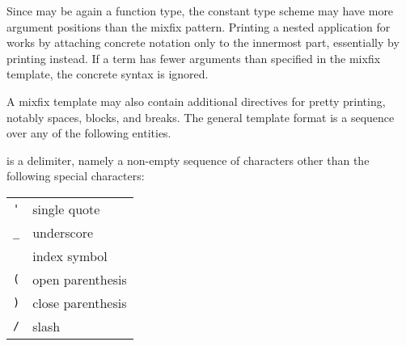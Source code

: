 \begin{isabellebody}
\begin{isamarkuptext}
  Since  may be again a function type, the constant
  type scheme may have more argument positions than the mixfix
  pattern.  Printing a nested application  for
   works by attaching concrete notation only to the
  innermost part, essentially by printing 
  instead.  If a term has fewer arguments than specified in the mixfix
  template, the concrete syntax is ignored.

  \medskip A mixfix template may also contain additional directives
  for pretty printing, notably spaces, blocks, and breaks.  The
  general template format is a sequence over any of the following
  entities.

  \begin{description}

  \item {} is a delimiter, namely a non-empty sequence of
  characters other than the following special characters:

  \smallskip
  \begin{tabular}{ll}
    \verb|'| & single quote \\
    \verb|_| & underscore \\
    \isa{{\isaliteral{22}{\isachardoublequote}}{\isaliteral{5C3C696E6465783E}{\isasymindex}}{\isaliteral{22}{\isachardoublequote}}} & index symbol \\
    \verb|(| & open parenthesis \\
    \verb|)| & close parenthesis \\
    \verb|/| & slash \\
  \end{tabular}
  \medskip


\end{description}
\end{isamarkuptext}
\end{isabellebody}
